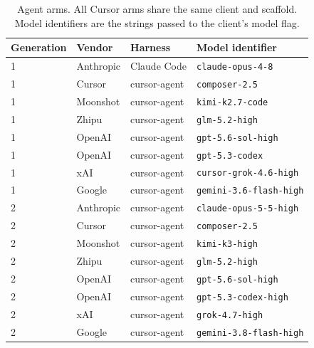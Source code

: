 \begin{table}[t]
\centering
\footnotesize
\caption{Agent arms. All Cursor arms share the same client and scaffold.
Model identifiers are the strings passed to the client's model flag.}
\label{tab:armlist}
\begin{tabular}{@{}llll@{}}
\toprule
Generation & Vendor & Harness & Model identifier \\
\midrule
1 & Anthropic & Claude Code & \texttt{claude-opus-4-8} \\
1 & Cursor    & cursor-agent & \texttt{composer-2.5} \\
1 & Moonshot  & cursor-agent & \texttt{kimi-k2.7-code} \\
1 & Zhipu     & cursor-agent & \texttt{glm-5.2-high} \\
1 & OpenAI    & cursor-agent & \texttt{gpt-5.6-sol-high} \\
1 & OpenAI    & cursor-agent & \texttt{gpt-5.3-codex} \\
1 & xAI       & cursor-agent & \texttt{cursor-grok-4.6-high} \\
1 & Google    & cursor-agent & \texttt{gemini-3.6-flash-high} \\
\midrule
2 & Anthropic & cursor-agent & \texttt{claude-opus-5-5-high} \\
2 & Cursor    & cursor-agent & \texttt{composer-2.5} \\
2 & Moonshot  & cursor-agent & \texttt{kimi-k3-high} \\
2 & Zhipu     & cursor-agent & \texttt{glm-5.2-high} \\
2 & OpenAI    & cursor-agent & \texttt{gpt-5.6-sol-high} \\
2 & OpenAI    & cursor-agent & \texttt{gpt-5.3-codex-high} \\
2 & xAI       & cursor-agent & \texttt{grok-4.7-high} \\
2 & Google    & cursor-agent & \texttt{gemini-3.8-flash-high} \\
\bottomrule
\end{tabular}
\end{table}

